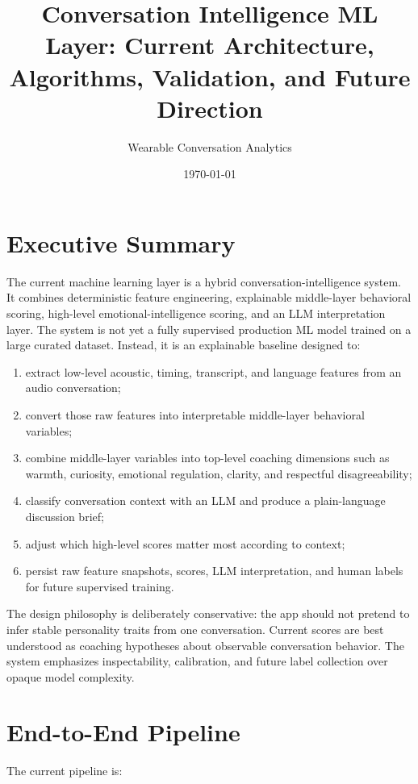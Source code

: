 \documentclass[11pt]{article}
\title{Conversation Intelligence ML Layer: Current Architecture, Algorithms, Validation, and Future Direction}
\author{Wearable Conversation Analytics}
\date{\today}
\begin{document}
\maketitle

\section{Executive Summary}

The current machine learning layer is a hybrid conversation-intelligence system. It combines deterministic feature engineering, explainable middle-layer behavioral scoring, high-level emotional-intelligence scoring, and an LLM interpretation layer. The system is not yet a fully supervised production ML model trained on a large curated dataset. Instead, it is an explainable baseline designed to:

\begin{enumerate}[leftmargin=*]
  \item extract low-level acoustic, timing, transcript, and language features from an audio conversation;
  \item convert those raw features into interpretable middle-layer behavioral variables;
  \item combine middle-layer variables into top-level coaching dimensions such as warmth, curiosity, emotional regulation, clarity, and respectful disagreeability;
  \item classify conversation context with an LLM and produce a plain-language discussion brief;
  \item adjust which high-level scores matter most according to context;
  \item persist raw feature snapshots, scores, LLM interpretation, and human labels for future supervised training.
\end{enumerate}

The design philosophy is deliberately conservative: the app should not pretend to infer stable personality traits from one conversation. Current scores are best understood as coaching hypotheses about observable conversation behavior. The system emphasizes inspectability, calibration, and future label collection over opaque model complexity.

\section{End-to-End Pipeline}

The current pipeline is:
\end{document}
